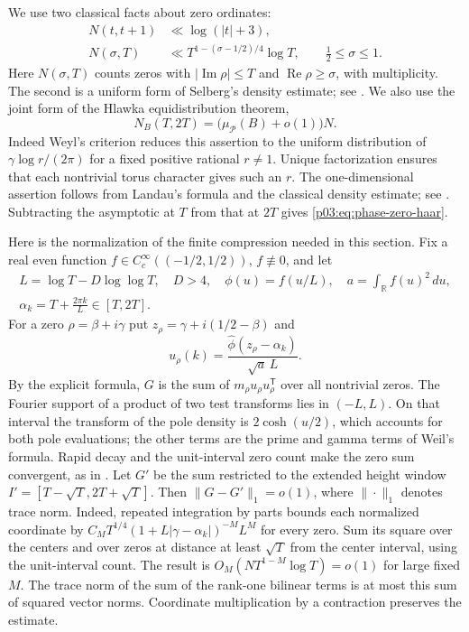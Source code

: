 \documentclass[11pt,letterpaper]{article}
\theoremstyle{definition}
\theoremstyle{remark}
\newcommand{\R}{\mathbb R}
\renewcommand{\Re}{\operatorname{Re}}
\renewcommand{\Im}{\operatorname{Im}}
\newcommand{\1}{\mathbf 1}
\begin{document}
We use two classical facts about zero ordinates:
\begin{align}
 N(t,t+1)&\ll\log(|t|+3),\label{p03:eq:phase-local-zero-count}\\
 N(\sigma,T)&\ll T^{1-(\sigma-1/2)/4}\log T,
 \qquad \tfrac12\le\sigma\le1.\label{p03:eq:phase-selberg-density}
\end{align}
Here $N(\sigma,T)$ counts zeros with $|\Im\rho|\le T$ and
$\Re\rho\ge\sigma$, with multiplicity. The second is a uniform form of Selberg's density estimate; see
\cite[Lemma~2]{FordZaharescu}.  We also use the joint form of the
Hlawka equidistribution theorem,
\begin{equation}
 N_B(T,2T)=\bigl(\mu_{\mathcal P}(B)+o(1)\bigr)N.
 \label{p03:eq:phase-zero-haar}
\end{equation}
Indeed Weyl's criterion reduces this assertion to the uniform
distribution of $\gamma\log r/(2\pi)$ for a fixed positive rational
$r\ne1$.  Unique factorization ensures that each nontrivial torus
character gives such an $r$.  The one-dimensional assertion follows
from Landau's formula and the classical density estimate; see
\cite{AkbaryMurty}.  Subtracting the asymptotic at $T$ from that at
$2T$ gives \eqref{p03:eq:phase-zero-haar}.

Here is the normalization of the finite compression needed in this
section.  Fix a real even function
$f\in C_c^\infty((-1/2,1/2))$, $f\not\equiv0$, and let
\begin{gather*}
 L=\log T-D\log\log T,\quad D>4,\quad
 \phi(u)=f(u/L),\quad a=\int_{\R}f(u)^2\,du,\\
 \alpha_k=T+\frac{2\pi k}{L}\in[T,2T].
\end{gather*}
For a zero $\rho=\beta+i\gamma$ put
$z_\rho=\gamma+i(1/2-\beta)$ and
\begin{equation}
 u_\rho(k)=\frac{\widehat\phi(z_\rho-\alpha_k)}{\sqrt a\,L}.
 \label{p03:eq:phase-normalized-vector}
\end{equation}
By the explicit formula, $G$ is the sum of
$m_\rho u_\rho u_\rho^{\mathsf T}$ over all nontrivial zeros.
The Fourier support of a product of two test transforms lies
in $(-L,L)$. On that interval the transform of the pole density
is $2\cosh(u/2)$, which accounts for both pole evaluations;
the other terms are the prime and gamma terms of Weil's formula.
Rapid decay and the unit-interval zero count make the zero sum
convergent, as in \cite{AlpogeFurman}.
Let $G'$ be the sum restricted to the extended height window
$I'=[T-\sqrt T,2T+\sqrt T]$. Then $\|G-G'\|_1=o(1)$,
where $\|\cdot\|_1$ denotes trace norm.
Indeed, repeated integration by parts bounds each
normalized coordinate by
$C_M T^{1/4}(1+L|\gamma-\alpha_k|)^{-M}L^M$ for every zero.
Sum its square over the centers and over zeros at distance at least
$\sqrt T$ from the center interval, using the unit-interval count.
The result is $O_M(NT^{1-M}\log T)=o(1)$ for large fixed $M$.
The trace norm of the sum of the rank-one bilinear terms is at most
this sum of squared vector norms. Coordinate multiplication by a
contraction preserves the estimate.
\end{document}
